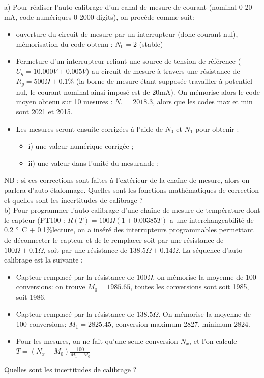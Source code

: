 a)	Pour réaliser l'auto calibrage d'un canal de mesure de courant (nominal 0-20 mA, code numériques 0-2000 digits), on procède comme suit:
\begin{itemize}
\item ouverture du circuit de mesure par un interrupteur (donc courant nul), mémorisation du code obtenu :  $N_0=2$ (stable)
\item Fermeture d'un interrupteur reliant une source de tension de référence ($U_g = 10.000V \pm 0.005V$) au circuit de mesure à travers une résistance de $R_g = 500 \Omega \pm 0.1\%$ (la borne de mesure étant supposée travailler à potentiel nul, le courant nominal ainsi imposé est de 20mA). On mémorise alors le code moyen obtenu sur 10 mesures : $N_1 = 2018.3$, alors que les codes max et min sont 2021 et 2015.
\item Les mesures seront ensuite corrigées à l'aide de $N_0$ et $N_1$ pour obtenir :
	\begin{itemize}\itemsep1pt
	\renewcommand{\labelitemi}{$\bullet$}
	\item i) une valeur numérique corrigée ;
	\item ii) une valeur dans l'unité du mesurande ;
	\end{itemize}
\end{itemize}
NB : si ces corrections sont faites à l'extérieur de la chaîne de mesure, alors on parlera d'auto étalonnage.
Quelles sont les fonctions mathématiques de correction et quelles sont les incertitudes de calibrage ?\\

b)	Pour programmer l'auto calibrage d'une chaîne de mesure de température dont le capteur (PT100 : $R(T)=100 \Omega (1+0.00385T)$ a une interchangeabilité de 0.2 $\degree$ C + 0.1\%lecture, on a inséré des interrupteurs programmables permettant de déconnecter le capteur et de le remplacer soit par une résistance de$ 100 \Omega \pm 0.1 \Omega$, soit par une résistance de $138.5 \Omega \pm 0.14 \Omega$. La séquence d'auto calibrage est la suivante :
\begin{itemize}
\item Capteur remplacé par la résistance de $100 \Omega$, on mémorise la moyenne de 100 conversions: on trouve $M_0=1985.65$, toutes les conversions sont soit 1985, soit 1986.
\item Capteur remplacé par la résistance de $138.5 \Omega$. On mémorise la moyenne de 100 conversions: $M_1=2825.45$, conversion maximum 2827, minimum 2824.
\item Pour les mesures, on ne fait qu'une seule conversion $N_x$, et l'on calcule \\
$T= (N_x - M_0)\frac{100}{M_1 - M_0}$
\end{itemize}
Quelles sont les incertitudes de calibrage ? \\

